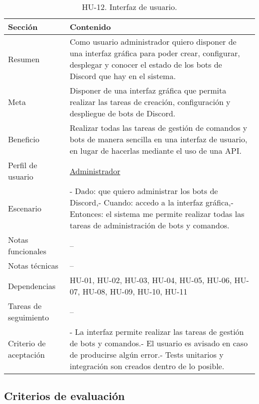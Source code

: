\begin{table}[H]
    \centering
    \def\arraystretch{1.25}
    \begin{adjustbox}{max width=\textwidth}
    \begin{tabularx}{\textwidth}{l|L}
    \hline
        \textbf{Sección} & \textbf{Contenido} \\ \hline
    \hline
        Resumen & Como usuario administrador quiero disponer de una interfaz gráfica para poder crear, configurar, desplegar y conocer el estado de los bots de Discord que hay en el sistema. \\ \hline
        Meta & Disponer de una interfaz gráfica que permita realizar las tareas de creación, configuración y despliegue de bots de Discord. \\ \hline
        Beneficio & Realizar todas las tareas de gestión de comandos y bots de manera sencilla en una interfaz de usuario, en lugar de hacerlas mediante el uso de una API. \\ \hline
        Perfil de usuario & \hyperref[sec:personaAdmin]{Administrador} \\ \hline
        Escenario & - Dado: que quiero administrar los bots de Discord,\linebreak - Cuando: accedo a la interfaz gráfica,\linebreak - Entonces: el sistema me permite realizar todas las tareas de administración de bots y comandos. \\ \hline
        Notas funcionales & – \\ \hline
        Notas técnicas & – \\ \hline
        Dependencias & HU-01, HU-02, HU-03, HU-04, HU-05, HU-06, HU-07, HU-08, HU-09, HU-10, HU-11 \\ \hline
        Tareas de seguimiento & – \\ \hline
        Criterio de aceptación & - La interfaz permite realizar las tareas de gestión de bots y comandos.\linebreak - El usuario es avisado en caso de producirse algún error.\linebreak - Tests unitarios y integración son creados dentro de lo posible. \\ \hline
    \end{tabularx}
    \end{adjustbox}
    \caption{HU-12. Interfaz de usuario.}
\end{table}

\subsection{Criterios de evaluación}

